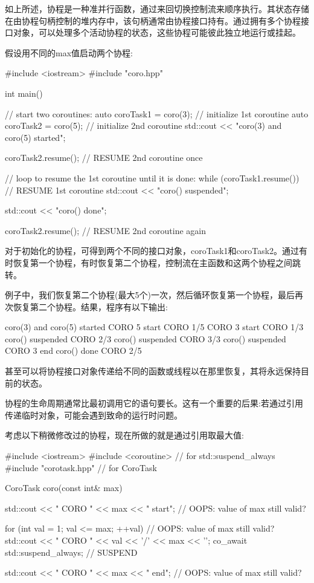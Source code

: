 如上所述，协程是一种准并行函数，通过来回切换控制流来顺序执行。其状态存储在由协程句柄控制的堆内存中，该句柄通常由协程接口持有。通过拥有多个协程接口对象，可以处理多个活动协程的状态，这些协程可能彼此独立地运行或挂起。

假设用不同的max值启动两个协程:


\begin{cpp}
#include <iostream>
#include "coro.hpp"

int main()
{
	// start two coroutines:
	auto coroTask1 = coro(3); // initialize 1st coroutine
	auto coroTask2 = coro(5); // initialize 2nd coroutine
	std::cout << "coro(3) and coro(5) started\n";
	
	coroTask2.resume(); // RESUME 2nd coroutine once
	
	// loop to resume the 1st coroutine until it is done:
	while (coroTask1.resume()) { // RESUME 1st coroutine
		std::cout << "coro() suspended\n";
	}
	
	std::cout << "coro() done\n";
	
	coroTask2.resume(); // RESUME 2nd coroutine again
}
\end{cpp}

对于初始化的协程，可得到两个不同的接口对象，coroTask1和coroTask2。通过有时恢复第一个协程，有时恢复第二个协程，控制流在主函数和这两个协程之间跳转。

例子中，我们恢复第二个协程(最大5个)一次，然后循环恢复第一个协程，最后再次恢复第二个协程。结果，程序有以下输出:

\begin{shell}
coro(3) and coro(5) started
         CORO 5 start
         CORO 1/5
         CORO 3 start
         CORO 1/3
coro() suspended
         CORO 2/3
coro() suspended
         CORO 3/3
coro() suspended
         CORO 3 end
coro() done
         CORO 2/5
\end{shell}

甚至可以将协程接口对象传递给不同的函数或线程以在那里恢复，其将永远保持目前的状态。


协程的生命周期通常比最初调用它的语句要长。这有一个重要的后果:若通过引用传递临时对象，可能会遇到致命的运行时问题。

考虑以下稍微修改过的协程，现在所做的就是通过引用取最大值:


\begin{cpp}
#include <iostream>
#include <coroutine> // for std::suspend_always{}
#include "corotask.hpp" // for CoroTask

CoroTask coro(const int& max)
{
	std::cout << "   CORO " << max << " start\n"; // OOPS: value of max still valid?
	
	for (int val = 1; val <= max; ++val) { // OOPS: value of max still valid?
		std::cout << " CORO " << val << '/' << max << '\n';
		co_await std::suspend_always{}; // SUSPEND
	}
	
	std::cout << " CORO " << max << " end\n"; // OOPS: value of max still valid?
}
\end{cpp}

